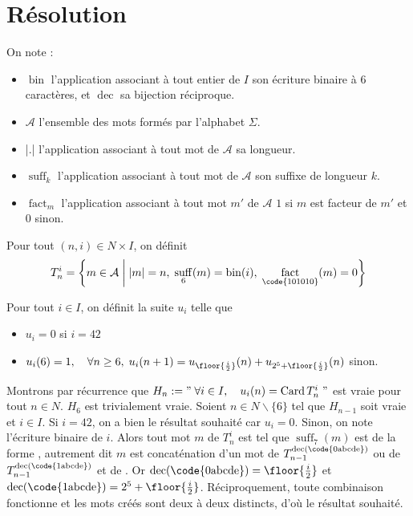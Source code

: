\documentclass{hibiscus}
\DeclareMathOperator{\bin}{bin}
\DeclareMathOperator{\dec}{dec}
\DeclareMathOperator{\suff}{suff}
\DeclareMathOperator{\fact}{fact}
\DeclareMathOperator{\Card}{Card}
\begin{document}
\section{Résolution}

\par \medskip On note :
\begin{itemize}
\item $\bin$ l'application associant à tout entier de $I$ son écriture binaire à 6 caractères, et $\dec$ sa bijection réciproque.
\item $\mathcal{A}$ l'ensemble des mots formés par l'alphabet $\Sigma$.
\item |.| l'application associant à tout mot de $\mathcal{A}$ sa longueur.
\item $\suff_k$ l'application associant à tout mot de $\mathcal{A}$ son suffixe de longueur $k$.
\item $\fact_m$ l'application associant à tout mot $m'$ de $\mathcal{A}$ $1$ si $m$ est facteur de $m'$ et $0$ sinon.
\end{itemize}

\par \medskip Pour tout $(n, i) \in N \times I$, on définit $$ T_n^i = \left \{ m \in \mathcal{A} \; \middle| \; |m| = n, \; \suff_6(m) = \bin(i), \; \fact_\text{\code{101010}}(m) = 0 \right \} $$

\par \medskip Pour tout $i \in I$, on définit la suite $u_i$ telle que
\begin{itemize}
\item $u_i = 0$ si $i = 42$
\item $u_i(6) = 1, \quad \forall n \geq 6, \; u_i(n+1) = u_{\floor{\frac{i}{2}}}(n) + u_{2^5 + \floor{\frac{i}{2}}}(n)$ sinon.
\end{itemize}

\par \medskip Montrons par récurrence que $ H_n := " \; \forall i \in I, \quad u_i(n) = \Card T_n^i \; " $ est vraie pour tout $n \in N$. $H_6$ est trivialement vraie. Soient $n \in N \backslash\{6\}$ tel que $H_{n-1}$ soit vraie et $i \in I$. Si $i = 42$, on a bien le résultat souhaité car $u_i = 0$. Sinon, on note  l'écriture binaire de $i$. Alors tout mot $m$ de $T_n^i$ est tel que $\suff_7(m)$ est de la forme , autrement dit $m$ est concaténation d'un mot de $T_{n-1}^{\dec(\text{\code{0abcde}})}$ ou de $T_{n-1}^{\dec(\text{\code{1abcde}})}$ et de . Or $\dec(\text{\code{0abcde}}) = \floor{\frac{i}{2}}$ et $\dec(\text{\code{1abcde}}) = 2^5 + \floor{\frac{i}{2}}$. Réciproquement, toute combinaison fonctionne et les mots créés sont deux à deux distincts, d'où le résultat souhaité.
\end{document}
